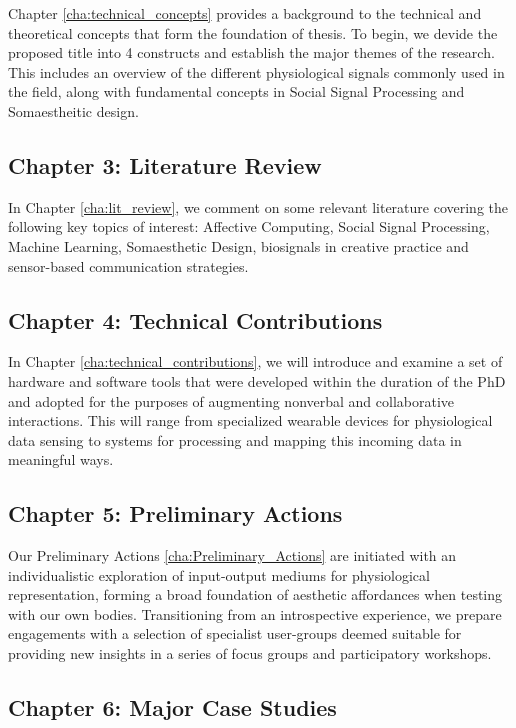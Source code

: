 Chapter \ref{cha:technical_concepts} provides a background to the technical and theoretical concepts that form the foundation of thesis. To begin, we devide the proposed title into 4 constructs and establish the major themes of the research. This includes an overview of the different physiological signals commonly used in the field, along with fundamental concepts in Social Signal Processing and Somaestheitic design.

\subsection{Chapter 3: Literature Review}

In Chapter \ref{cha:lit_review}, we comment on some relevant literature covering the following key topics of interest: Affective Computing, Social Signal Processing, Machine Learning, Somaesthetic Design, biosignals in creative practice and sensor-based communication strategies.

\subsection{Chapter 4: Technical Contributions}

In Chapter \ref{cha:technical_contributions}, we will introduce and examine a set of hardware and software tools that were developed within the duration of the PhD and adopted for the purposes of augmenting nonverbal and collaborative interactions. This will range from specialized wearable devices for physiological data sensing to systems for processing and mapping this incoming data in meaningful ways.

\subsection{Chapter 5: Preliminary Actions}

Our Preliminary Actions \ref{cha:Preliminary_Actions} are initiated with an individualistic exploration of input-output mediums for physiological representation, forming a broad foundation of aesthetic affordances when testing with our own bodies. Transitioning from an introspective experience, we prepare engagements with a selection of specialist user-groups deemed suitable for providing new insights in a series of focus groups and participatory workshops.

\subsection{Chapter 6: Major Case Studies}

